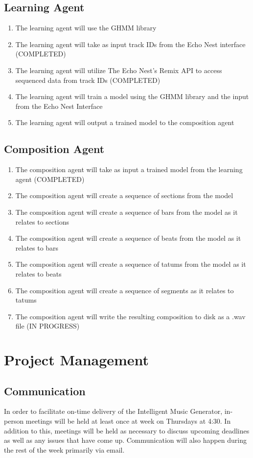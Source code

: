 \documentclass{article}
\begin{document}
\subsection{Learning Agent}
\begin{enumerate}
\item The learning agent will use the GHMM library
\item The learning agent will take as input track IDs from the Echo Nest interface (COMPLETED)
\item The learning agent will utilize The Echo Nest's Remix API \cite{Remix} to access sequenced data from track IDs (COMPLETED)
\item The learning agent will train a model using the GHMM library and the input from the Echo Nest Interface 
\item The learning agent will output a trained model to the composition agent 
\end{enumerate}

\subsection{Composition Agent}
\begin{enumerate}
\item The composition agent will take as input a trained model from the learning agent (COMPLETED)
\item The composition agent will create a sequence of sections from the model
\item The composition agent will create a sequence of bars from the model as it relates to sections
\item The composition agent will create a sequence of beats from the model as it relates to bars
\item The composition agent will create a sequence of tatums from the model as it relates to beats
\item The composition agent will create a sequence of segments as it relates to tatums
\item The composition agent will write the resulting composition to disk as a .wav file (IN PROGRESS)
\end{enumerate}

\section{Project Management}
\subsection{Communication}
In order to facilitate on-time delivery of the Intelligent Music Generator, in-person meetings 
will be held at least once at week on Thursdays at 4:30. In addition to this, meetings will be 
held as necessary to discuss upcoming deadlines as well as any issues that have come up. 
Communication will also happen during the rest of the week primarily via email.
\end{document}
